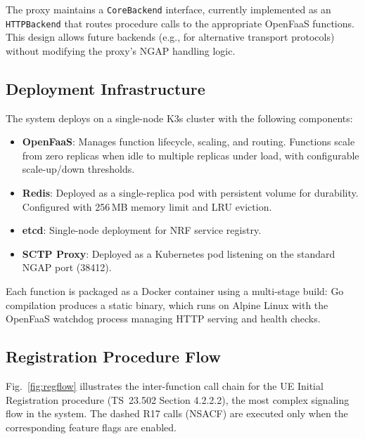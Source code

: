 The proxy maintains a \texttt{CoreBackend} interface, currently implemented as an \texttt{HTTPBackend} that routes procedure calls to the appropriate OpenFaaS functions. This design allows future backends (e.g., for alternative transport protocols) without modifying the proxy's NGAP handling logic.

\subsection{Deployment Infrastructure}

The system deploys on a single-node K3s cluster with the following components:
\begin{itemize}
    \item \textbf{OpenFaaS}: Manages function lifecycle, scaling, and routing. Functions scale from zero replicas when idle to multiple replicas under load, with configurable scale-up/down thresholds.
    \item \textbf{Redis}: Deployed as a single-replica pod with persistent volume for durability. Configured with 256\,MB memory limit and LRU eviction.
    \item \textbf{etcd}: Single-node deployment for NRF service registry.
    \item \textbf{SCTP Proxy}: Deployed as a Kubernetes pod listening on the standard NGAP port (38412).
\end{itemize}

Each function is packaged as a Docker container using a multi-stage build: Go compilation produces a static binary, which runs on Alpine Linux with the OpenFaaS watchdog process managing HTTP serving and health checks.

\subsection{Registration Procedure Flow}

Fig.~\ref{fig:regflow} illustrates the inter-function call chain for the UE Initial Registration procedure (TS~23.502 Section 4.2.2.2), the most complex signaling flow in the system. The dashed R17 calls (NSACF) are executed only when the corresponding feature flags are enabled.

